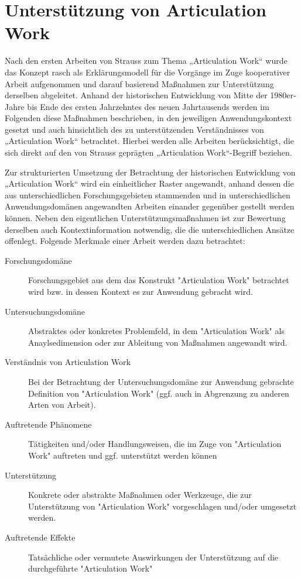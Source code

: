 \section{Unterstützung von Articulation Work} %
\label{sec:unterstützung_von_articulation_work}

Nach den ersten Arbeiten von Strauss zum Thema „Articulation Work“ wurde das Konzept rasch als Erklärungsmodell für die Vorgänge im Zuge kooperativer Arbeit aufgenommen und darauf basierend Maßnahmen zur Unterstützung derselben abgeleitet. Anhand der historischen Entwicklung von Mitte der 1980er-Jahre bis Ende des ersten Jahrzehntes des neuen Jahrtausends werden im Folgenden diese Maßnahmen beschrieben, in den jeweiligen Anwendungskontext gesetzt und auch hinsichtlich des zu unterstützenden Verständnisses von „Articulation Work“ betrachtet. Hierbei werden alle Arbeiten berücksichtigt, die sich direkt auf den von Strauss geprägten „Articulation Work“-Begriff beziehen.

Zur strukturierten Umsetzung der Betrachtung der historischen Entwicklung von „Articulation Work“ wird ein einheitlicher Raster angewandt, anhand dessen die aus unterschiedlichen Forschungsgebieten stammenden und in unterschiedlichen Anwendungsdomänen angewandten Arbeiten einander gegenüber gestellt werden können. Neben den eigentlichen Unterstützungsmaßnahmen ist zur Bewertung derselben auch Kontextinformation notwendig, die die unterschiedlichen Ansätze offenlegt. Folgende Merkmale einer Arbeit werden dazu betrachtet:
\begin{description}
 \item[Forschungsdomäne] Forschungsgebiet aus dem das Konstrukt "Articulation Work" betrachtet wird bzw. in dessen Kontext es zur Anwendung gebracht wird.
 \item[Untersuchungsdomäne] Abstraktes oder konkretes Problemfeld, in dem "Articulation Work" als Anaylsedimension oder zur Ableitung von Maßnahmen angewandt wird.
 \item[Verständnis von Articulation Work] Bei der Betrachtung der Untersuchungsdomäne zur Anwendung gebrachte Definition von "Articulation Work" (ggf. auch in Abgrenzung zu anderen Arten von Arbeit).
 \item[Auftretende Phänomene] Tätigkeiten und/oder Handlungsweisen, die im Zuge von "Articulation Work" auftreten und ggf. unterstützt werden können
 \item[Unterstützung] Konkrete oder abstrakte Maßnahmen oder Werkzeuge, die zur Unterstützung von "Articulation Work" vorgeschlagen und/oder umgesetzt werden.
 \item[Auftretende Effekte] Tatsächliche oder vermutete Auswirkungen der Unterstützung auf die durchgeführte "Articulation Work"
 \end{description}

